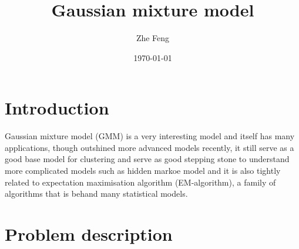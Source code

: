 \documentclass{article} [10pt] %
\title{Gaussian mixture model}
\author{Zhe Feng}
\date{\today}
\begin{document}
\noindent
\maketitle
\section{Introduction}
Gaussian mixture model (GMM) is a very interesting model and itself has many applications, though outshined more advanced models recently, it still serve as a good base model for clustering and serve as good stepping stone to understand more complicated models such as hidden markoe model and it is also tightly related to expectation maximisation algorithm (EM-algorithm), a family of algorithms that is behand many statistical models.


\section{Problem description}	\label{sec:problem_ddescription}
\end{document}
